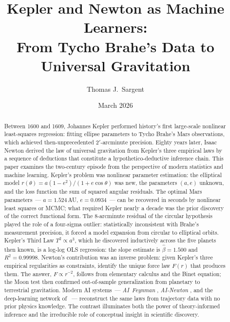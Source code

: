 \documentclass[12pt]{article}
\title{Kepler and Newton as Machine Learners:\\
       From Tycho Brahe's Data to Universal Gravitation}
\author{Thomas J.\ Sargent}
\date{March 2026}
\begin{document}
\maketitle

\begin{abstract}
Between 1600 and 1609, Johannes Kepler performed history's first large-scale
nonlinear least-squares regression: fitting ellipse parameters to Tycho Brahe's
Mars observations, which achieved then-unprecedented $2'$-arc\-minute precision.
Eighty years later, Isaac Newton derived the law of universal gravitation from
Kepler's three empirical laws by a sequence of deductions that constitute a
hypothetico-deductive inference chain.  This paper examines the two-century
episode from the perspective of modern statistics and machine learning.
Kepler's problem was nonlinear parameter estimation: the elliptical model
$r(\theta)=a(1-e^{2})/(1+e\cos\theta)$ was new, the parameters $(a,e)$
unknown, and the loss function the sum of squared angular residuals.
The optimal Mars parameters~--- $a=1.524$\,AU, $e=0.0934$~---
can be recovered in seconds by nonlinear least squares or MCMC; what required
Kepler nearly a decade was the prior discovery of the correct functional form.
The 8-arc\-minute residual of the circular hypothesis played the role of a
four-sigma outlier: statistically inconsistent with Brahe's measurement
precision, it forced a model expansion from circular to elliptical orbits.
Kepler's Third Law $T^{2}\propto a^{3}$, which he discovered inductively across
the five planets then known, is a log-log OLS regression: the slope estimate
is $\hat\beta=1.500$ and $R^{2}=0.99998$.
Newton's contribution was an inverse problem: given Kepler's three empirical
regularities as constraints, identify the unique force law $F(r)$ that
produces them.  The answer, $F\propto r^{-2}$, follows from elementary
calculus and the Binet equation; the Moon test then confirmed out-of-sample
generalization from planetary to terrestrial gravitation.
Modern AI systems~---
\textit{AI~Feynman} \citep{Udrescu2020},
\textit{AI-Newton} \citep{FangEtAl2023},
and the deep-learning network of \citet{Lemos2023}~---
reconstruct the same laws from trajectory data with no prior physics knowledge.
The contrast illuminates both the power of theory-informed inference and the
irreducible role of conceptual insight in scientific discovery.
\end{abstract}

\tableofcontents

\end{document}
